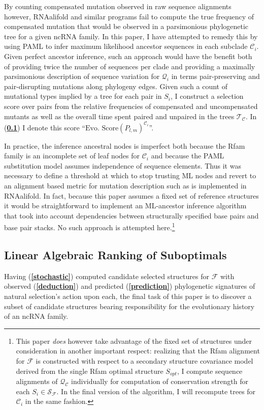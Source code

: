 \documentclass[12pt,a4paper]{article}
\begin{document}
By counting compensated mutation observed in raw sequence alignments however, RNAalifold and similar programs fail to compute the true frequency of compensated mutation that would be observed in a parsimonious phylogenetic tree for a given ncRNA family. In this paper, I have attempted to remedy this by using PAML to infer maximum likelihood ancestor sequences in each subclade $\mathcal{C}_i$. Given perfect ancestor inference, such an approach would have the benefit both of providing twice the number of sequences per clade and providing a maximally parsimonious description of sequence variation for $\mathcal{Q}_i$ in terms pair-preserving and pair-disrupting mutations along phylogeny edges. Given such a count of mutational types implied by a tree for each pair in $S_i$, I construct a selection score over pairs from the relative frequencies of compensated and uncompensated mutants as well as the overall time spent paired and unpaired in the trees $\mathcal{T_C}$. In (\textbf{\ref{algebra}}) I denote this score ``$\text{Evo. Score}\left(P_{l,m} \right)^{\mathcal{C}_i}$''.

In practice, the inference ancestral nodes is imperfect both because the Rfam family is an incomplete set of leaf nodes for $\mathcal{C}_i$ and because the PAML substitution model assumes independence of sequence elements. Thus it was necessary to define a threshold at which to stop trusting ML nodes and revert to an alignment based metric for mutation description such as is implemented in RNAalifold. In fact, because this paper assumes a fixed set of reference structures it would be straightforward to implement an ML-ancestor inference algorithm that took into account dependencies between structurally specified base pairs and base pair stacks. No such approach is attempted here.\footnote{This paper \emph{does} however take advantage of the fixed set of structures under consideration in another important respect: realizing that the Rfam alignment for $\mathcal{F}$ is constructed with respect to a secondary structure covariance model derived from the single Rfam optimal structure $S_{opt}$, I compute sequence alignments of $\mathcal{Q_C}$ individually for computation of conservation strength for each $S_i \in \mathcal{S_F}$. In the final version of the algorithm, I will recompute trees for $\mathcal{C}_i$ in the same fashion.}


\subsection{Linear Algebraic Ranking of Suboptimals}\label{algebra}Having (\textbf{\ref{stochastic}}) computed candidate selected structures for $\mathcal{F}$ with  observed (\textbf{\ref{deduction}})  and predicted (\textbf{\ref{prediction}}) phylogenetic signatures of natural selection's action upon each, the final task of this paper is to discover a subset of candidate structures bearing responsibility for the evolutionary history of an ncRNA family.
\end{document}
